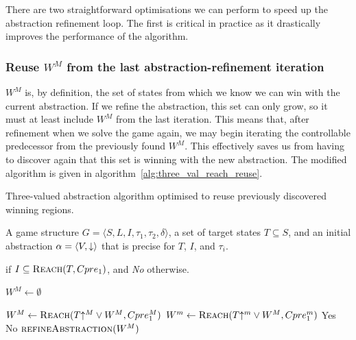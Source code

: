There are two straightforward optimisations we can perform to speed up the abstraction refinement loop. The first is critical in practice as it drastically improves the performance of the algorithm.

\subsubsection{Reuse $W^M$ from the last abstraction-refinement iteration}

$W^M$ is, by definition, the set of states from which we know we can win with the current abstraction. If we refine the abstraction, this set can only grow, so it must at least include $W^M$ from the last iteration. This means that, after refinement when we solve the game again, we may begin iterating the controllable predecessor from the previously found $W^M$. This effectively saves us from having to discover again that this set is winning with the new abstraction. The modified algorithm is given in algorithm~\ref{alg:three_val_reach_reuse}.

\begin{algorithm}
\caption{Three-valued abstraction algorithm optimised to reuse previously discovered winning regions.}
\label{alg:three_val_reach_reuse}

\begin{algorithmic}[1]

\Require A game structure $G = \langle S, L, I, \tau_1, \tau_2, \delta \rangle$, a set 
of target states $T\subseteq S$, and an initial abstraction $\alpha=\langle V, \mathord{\downarrow} \rangle$
that is precise for $T$, $I$, and $\tau_i$.

 if $I \subseteq \textsc{Reach}(T, Cpre_1)$, and {\it No} otherwise.


    \State $W^M \gets \emptyset$

    \Loop
        \State $W^M \gets \textsc{Reach}(T\mathord{\uparrow^M} \vee W^M, Cpre_1^M)$
        \State $W^m \gets \textsc{Reach}(T\mathord{\uparrow^m} \vee W^M, Cpre_1^m)$
            \State\Return Yes
            \State\Return No
        \Else       
            \State$\Call{refineAbstraction}{W^M}$
        \EndIf
    \EndLoop
\EndFunction

\end{algorithmic}
\end{algorithm}

